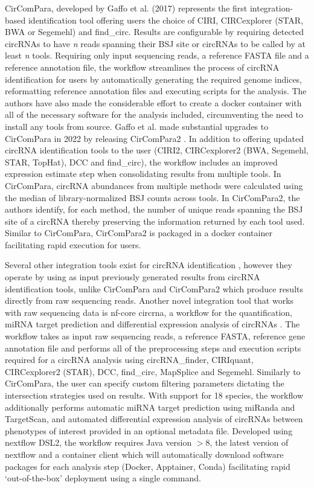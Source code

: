 CirComPara, developed by Gaffo et al. (2017) \cite{CirComPara} represents the first integration-based identification tool offering users the choice of CIRI, CIRCexplorer (STAR, BWA or Segemehl) and find\_circ. Results are configurable by requiring detected circRNAs to have \textit{n} reads spanning their BSJ site or circRNAs to be called by at least \textit{n} tools. Requiring only input sequencing reads, a reference FASTA file and a reference annotation file, the workflow streamlines the process of circRNA identification for users by automatically generating the required genome indices, reformatting reference annotation files and executing scripts for the analysis. The authors have also made the considerable effort to create a docker container with all of the necessary software for the analysis included, circumventing the need to install any tools from source. Gaffo et al. made substantial upgrades to CirComPara in 2022 by releasing CirComPara2 \cite{CirComPara2}. In addition to offering updated circRNA identification tools to the user (CIRI2, CIRCexplorer2 (BWA, Segemehl, STAR, TopHat), DCC and find\_circ), the workflow includes an improved expression estimate step when consolidating results from multiple tools. In CirComPara, circRNA abundances from multiple methods were calculated using the median of library-normalized BSJ counts across tools. In CirComPara2, the authors identify, for each method, the number of unique reads spanning the BSJ site of a circRNA thereby preserving the information returned by each tool used. Similar to CirComPara, CirComPara2 is packaged in a docker container facilitating rapid execution for users. \par
Several other integration tools exist for circRNA identification \cite{circRNAwrap, DEBKS, circmeta, circRNAprofiler, FcircSEC}, however they operate by using as input previously generated results from circRNA identification tools, unlike CirComPara and CirComPara2 which produce results directly from raw sequencing reads. Another novel integration tool that works with raw sequencing data is nf-core circrna, a workflow for the quantification, miRNA target prediction and differential expression analysis of circRNAs \cite{Digby2023Dec}. The workflow takes as input raw sequencing reads, a reference FASTA, reference gene annotation file and performs all of the preprocessing steps and execution scripts required for a circRNA analysis using circRNA\_finder, CIRIquant, CIRCexplorer2 (STAR), DCC, find\_circ, MapSplice and Segemehl. Similarly to CirComPara, the user can specify custom filtering parameters dictating the intersection strategies used on results. With support for 18 species, the workflow additionally performs automatic miRNA target prediction using miRanda and TargetScan, and automated differential expression analysis of circRNAs between phenotypes of interest provided in an optional metadata file. Developed using nextflow DSL2, the workflow requires Java version $>$8, the latest version of nextflow and a container client which will automatically download software packages for each analysis step (Docker, Apptainer, Conda) facilitating rapid `out-of-the-box' deployment using a single command.

